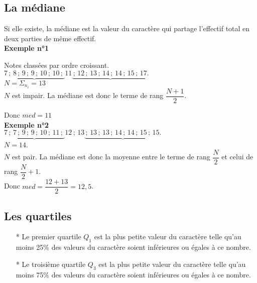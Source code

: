 \subsection{La médiane}

Si elle existe, la médiane est la valeur du caractère qui partage l'effectif total en deux parties de même effectif. \\

\textbf{Exemple n°1}

Notes classées par ordre croissant. \\

$ \underbrace{ 7 \, ; \,  8 \, ; \,  9 \, ; \,  9 \, ; \,  10 \, ; \,  10 \, ; \, } 11 \underbrace{\, ; \,  12 \, ; \,  13 \, ; \,  14 \, ; \,  14 \, ; \,  15 \, ; \,  17.} $ \\

$ N = \Sigma_{n_i} = 13$ \\

$N$ est impair. La médiane est donc le terme de rang $\dfrac{N+1}{2}$. 

Donc $med = 11$ \\

\textbf{Exemple n°2} \\

$ \underbrace{7 \, ; \,  7 \, ; \,  9 \, ; \,  9 \, ; \,  10 \, ; \,  11 \, ; \, } 12 \, ; \,  13 \underbrace{\, ; \,  13 \, ; \,  13 \, ; \,  14 \, ; \,  14 \, ; \,  15 \, ; \,  15.}$ \\

$ N = 14 $. \\

$N$ est pair. La médiane est donc la moyenne entre le terme de rang $\dfrac{N}{2}$ et celui de rang $\dfrac{N}{2} + 1$. \\
Donc $med = \dfrac{12 + 13}{2} = 12,5 $. 

\newpage

\subsection{Les quartiles}

\begin{itemize}
\item[*] Le premier quartile $Q_1$ est la plus petite valeur du caractère telle qu'au moins 25\% des valeurs du caractère soient inférieures ou égales à ce nombre.
\item[*] Le troisième quartile $Q_3$ est la plus petite valeur du caractère telle qu'au moins 75\% des valeurs du caractère soient inférieures ou égales à ce nombre.
\end{itemize}

